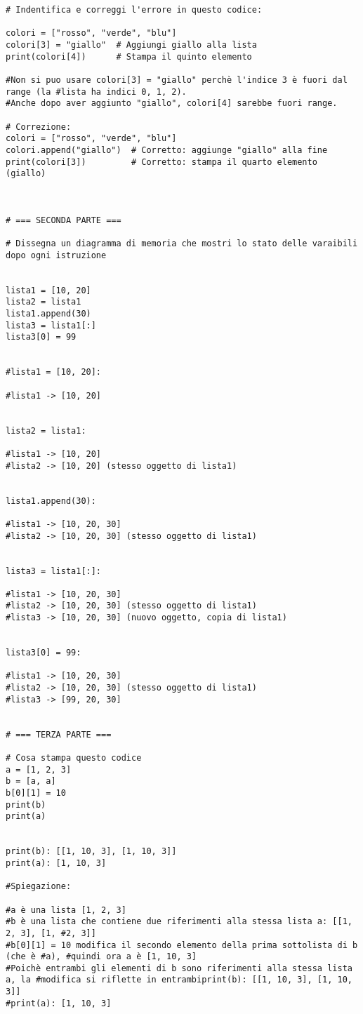 \begin{lstlisting}
# Indentifica e correggi l'errore in questo codice:

colori = ["rosso", "verde", "blu"]
colori[3] = "giallo"  # Aggiungi giallo alla lista
print(colori[4])      # Stampa il quinto elemento

#Non si puo usare colori[3] = "giallo" perchè l'indice 3 è fuori dal range (la #lista ha indici 0, 1, 2).
#Anche dopo aver aggiunto "giallo", colori[4] sarebbe fuori range.

# Correzione:
colori = ["rosso", "verde", "blu"]
colori.append("giallo")  # Corretto: aggiunge "giallo" alla fine
print(colori[3])         # Corretto: stampa il quarto elemento (giallo)



# === SECONDA PARTE === 

# Dissegna un diagramma di memoria che mostri lo stato delle varaibili dopo ogni istruzione


lista1 = [10, 20]
lista2 = lista1
lista1.append(30)
lista3 = lista1[:]
lista3[0] = 99


#lista1 = [10, 20]:

#lista1 -> [10, 20]


lista2 = lista1:

#lista1 -> [10, 20]
#lista2 -> [10, 20] (stesso oggetto di lista1)


lista1.append(30):

#lista1 -> [10, 20, 30]
#lista2 -> [10, 20, 30] (stesso oggetto di lista1)


lista3 = lista1[:]:

#lista1 -> [10, 20, 30]
#lista2 -> [10, 20, 30] (stesso oggetto di lista1)
#lista3 -> [10, 20, 30] (nuovo oggetto, copia di lista1)


lista3[0] = 99:

#lista1 -> [10, 20, 30]
#lista2 -> [10, 20, 30] (stesso oggetto di lista1)
#lista3 -> [99, 20, 30]


# === TERZA PARTE ===

# Cosa stampa questo codice
a = [1, 2, 3]
b = [a, a]
b[0][1] = 10
print(b)
print(a)


print(b): [[1, 10, 3], [1, 10, 3]]
print(a): [1, 10, 3]

#Spiegazione:

#a è una lista [1, 2, 3]
#b è una lista che contiene due riferimenti alla stessa lista a: [[1, 2, 3], [1, #2, 3]]
#b[0][1] = 10 modifica il secondo elemento della prima sottolista di b (che è #a), #quindi ora a è [1, 10, 3]
#Poichè entrambi gli elementi di b sono riferimenti alla stessa lista a, la #modifica si riflette in entrambiprint(b): [[1, 10, 3], [1, 10, 3]]
#print(a): [1, 10, 3]
\end{lstlisting}

\newpage